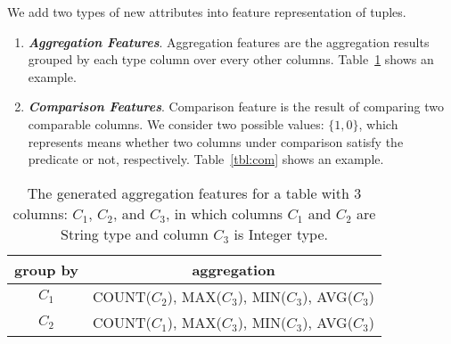 We add two types of new attributes into feature representation of tuples.


\begin{enumerate}

\item \textit{\textbf{Aggregation Features}}. Aggregation
features are the aggregation results grouped by each  type column
over every other columns. Table~\ref{tbl:agg} shows an example.


\item \textit{\textbf{Comparison Features}}. Comparison
feature is the result of comparing two comparable columns. We
consider two possible values:  $\{1, 0\}$,  which represents
means whether two columns under comparison satisfy the predicate or not, respectively.
Table~\ref{tbl:com} shows an example.


\end{enumerate}

\begin{table}[t]
	\begin{center}
		\begin{tabular}{|c|c|}
		\hline
		\textbf{group by}	& \textbf{aggregation} \\
		\hline
		$C_1$ 				& \textsf{COUNT}($C_2$), \textsf{MAX}($C_3$), \textsf{MIN}($C_3$), \textsf{AVG}($C_3$)\\
		$C_2$ 				& \textsf{COUNT}($C_1$), \textsf{MAX}($C_3$), \textsf{MIN}($C_3$), \textsf{AVG}($C_3$)\\
		\hline
		\end{tabular}
	\end{center}
	\caption{The generated aggregation features for
a table with 3 columns:  $C_1$, $C_2$, and $C_3$, in which
columns $C_1$ and $C_2$ are \textsf{String} type and column $C_3$ is
\textsf{Integer} type.}
	\label{tbl:agg}
\end{table}



